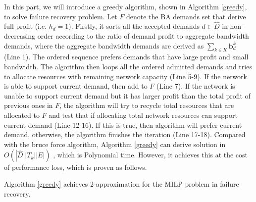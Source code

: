\documentclass[sigconf]{acmart}
\begin{document}
\begin{appendices}
 In this part, we will introduce a greedy algorithm, shown in Algorithm \ref{greedy}, to solve failure recovery problem.
 Let $F$ denote the BA demands set that derive full profit (i.e. $h_d=1$).
Firstly, it sorts all the accepted demands  $d\in \hat{D}$ in non-decreasing order according to the ratio of demand profit to aggregate bandwidth demands, where the aggregate bandwidth demands are derived as ${\sum_{k\in K}\mathbf{b}^k_d}$ (Line 1).
The ordered sequence prefers demands that have large profit and  small bandwidth.
The algorithm then loops all the ordered admitted demands and tries to allocate resources with remaining network capacity (Line 5-9).
If the network is able to support current demand, then add to $F$ (Line 7).
If the network is unable to support current demand  but  it has larger profit than the total profit of previous ones in $F$,  the algorithm will try to recycle total resources that are allocated to $F$ and test that if allocating total network resources can support current demand  (Line 12-16).
If this is true, then algorithm will prefer current demand, otherwise, the algorithm finishes the iteration (Line 17-18).
%
Compared with the bruce force algorithm, Algorithm \ref{greedy} can derive solution in $O(|\hat{D}||T_k||E|)$ , which is Polynomial time.
However, it achieves this at the cost of performance loss, which is proven as follows.
\begin{lemma}\label{greedy-app}
Algorithm \ref{greedy} achieves 2-approximation for the MILP problem in failure recovery.
\end{lemma}


\end{appendices}
\end{document}
